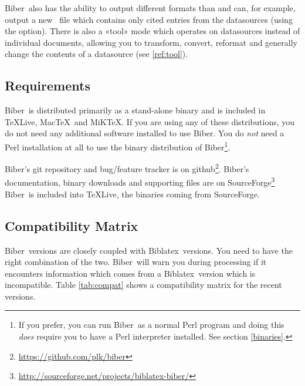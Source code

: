 \documentclass{ltxdockit}
\newcommand*{\biber}{Biber\xspace}
\newcommand*{\biblatex}{Biblatex\xspace}
\begin{document}
\biber\ also has the ability to output different formats than 
and can, for example, output a new \bibtex\ file which contains only
cited entries from the datasources (using the 
option). There is also a «tool» mode which operates on datasources instead
of individual documents, allowing you to transform, convert, reformat and
generally change the contents of a datasource (see \ref{ref:tool}).

\subsection{Requirements}\label{ref:req}

\biber\ is distributed primarily as a stand-alone binary and is
included in \TeX Live, Mac\TeX\ and MiK\TeX. If you are using any of these
distributions, you do not need any additional software installed to use
\biber. You do \emph{not} need a Perl installation at all to use
the binary distribution of \biber\footnote{If you prefer, you can run
\biber\ as a normal Perl program and doing this \emph{does} require
you to have a Perl interpreter installed. See section \ref{binaries}.}.

\biber's git repository and bug/feature tracker is on
github\footnote{\url{https://github.com/plk/biber}}. \biber's documentation,
binary downloads and supporting files are on
SourceForge\footnote{\url{http://sourceforge.net/projects/biblatex-biber/}}
\biber\ is included into \TeX Live, the binaries coming from SourceForge.

\subsection{Compatibility Matrix}

\biber\ versions are closely coupled with \biblatex\ versions. You
need to have the right combination of the two. \biber\ will warn you
during processing if it encounters information which comes from a
\biblatex\ version which is incompatible. Table \ref{tab:compat} shows a
compatibility matrix for the recent versions.
\end{document}
